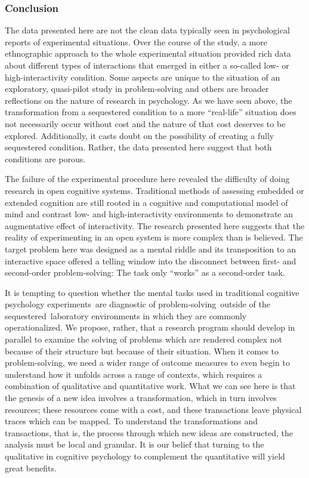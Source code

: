 \documentclass[twocolumn, serif, empirical, authordate]{jote-article}
\begin{document}
\subsubsection*{Conclusion}

The data presented here are not the clean data typically seen in psychological reports of experimental situations. Over the course of the study, a more ethnographic approach to the whole experimental situation provided rich data about different types of interactions that emerged in either a so-called low- or high-interactivity condition. Some aspects are unique to the situation of an exploratory, quasi-pilot study in problem-solving and others are broader reflections on the nature of research in psychology. As we have seen above, the transformation from a sequestered condition to a more ``real-life'' situation does not necessarily occur without cost and the nature of that cost deserves to be explored. Additionally, it casts doubt on the possibility of creating a fully sequestered condition. Rather, the data presented here suggest that both conditions are porous. 

The failure of the experimental procedure here revealed the difficulty of doing research in open cognitive systems. Traditional methods of assessing embedded or extended cognition are still rooted in a cognitive and computational model of mind and contrast low- and high-interactivity environments to demonstrate an augmentative effect of interactivity. The research presented here suggests that the reality of experimenting in an open system is more complex than is believed. The target problem here was designed as a mental riddle and its transposition to an interactive space offered a telling window into the disconnect between first- and second-order problem-solving: The task only ``works'' as a second-order task. 

It is tempting to question whether the mental tasks used in traditional cognitive psychology experiments~are diagnostic of problem-solving~outside of the sequestered~laboratory environments in which they are commonly operationalized. We propose, rather, that a research program should develop in parallel to examine the solving of problems which are rendered complex not because of their structure but because of their situation. When it comes to problem-solving, we need a wider range of outcome measures to even begin to understand how it unfolds across a range of contexts, which requires a combination of qualitative and quantitative work. What we can see here is that the genesis of a new idea involves a transformation, which in turn involves resources; these resources come with a cost, and these transactions leave physical traces which can be mapped. To understand the transformations and transactions, that is, the process through which new ideas are constructed, the analysis must be local and granular. It is our belief that turning to the qualitative in cognitive psychology to complement the quantitative will yield great benefits. 
\end{document}
